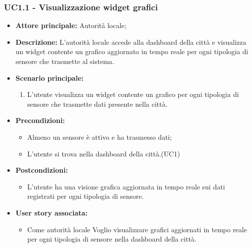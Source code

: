 \subsubsection{UC1.1 - Visualizzazione widget grafici}
\begin{itemize}
    \item \textbf{Attore principale:} Autorità locale;
    \item \textbf{Descrizione:} L'autorità locale accede alla dashboard della città e visualizza un widget contente un grafico aggiornato in tempo reale per ogni tipologia di sensore che trasmette al sistema.
    \item \textbf{Scenario principale:}
          \begin{enumerate}
              \item L'utente visualizza un widget contente un grafico per ogni tipologia di sensore che trasmette dati presente nella città.
          \end{enumerate}
    \item \textbf{Precondizioni:}
          \begin{itemize}
              \item  Almeno un sensore è attivo e ha trasmesso dati;
              \item L'utente si trova nella dashboard della città.(UC1)
          \end{itemize}
    \item \textbf{Postcondizioni:}
          \begin{itemize}
              \item      L'utente ha una visione grafica aggiornata in tempo reale sui dati registrati per ogni tipologia di sensore.
          \end{itemize}
    \item \textbf{User story associata:}
          \begin{itemize}
              \item Come autorità locale
                    Voglio visualizzare grafici aggiornati in tempo reale per ogni tipologia di sensore nella dashboard della città.
          \end{itemize}

\end{itemize}
